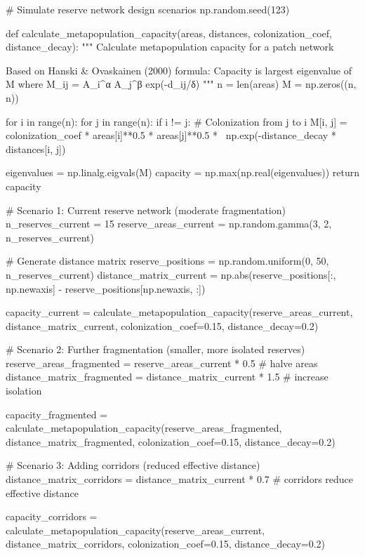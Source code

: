 \documentclass[11pt,a4paper]{article}
\begin{document}
\begin{pycode}
# Simulate reserve network design scenarios
np.random.seed(123)

def calculate_metapopulation_capacity(areas, distances, colonization_coef, distance_decay):
    """
    Calculate metapopulation capacity for a patch network

    Based on Hanski & Ovaskainen (2000) formula:
    Capacity is largest eigenvalue of M where M_ij = A_i^α A_j^β exp(-d_ij/δ)
    """
    n = len(areas)
    M = np.zeros((n, n))

    for i in range(n):
        for j in range(n):
            if i != j:
                # Colonization from j to i
                M[i, j] = colonization_coef * areas[i]**0.5 * areas[j]**0.5 * \
                         np.exp(-distance_decay * distances[i, j])

    eigenvalues = np.linalg.eigvals(M)
    capacity = np.max(np.real(eigenvalues))
    return capacity

# Scenario 1: Current reserve network (moderate fragmentation)
n_reserves_current = 15
reserve_areas_current = np.random.gamma(3, 2, n_reserves_current)

# Generate distance matrix
reserve_positions = np.random.uniform(0, 50, n_reserves_current)
distance_matrix_current = np.abs(reserve_positions[:, np.newaxis] - reserve_positions[np.newaxis, :])

capacity_current = calculate_metapopulation_capacity(reserve_areas_current, distance_matrix_current,
                                                    colonization_coef=0.15, distance_decay=0.2)

# Scenario 2: Further fragmentation (smaller, more isolated reserves)
reserve_areas_fragmented = reserve_areas_current * 0.5  # halve areas
distance_matrix_fragmented = distance_matrix_current * 1.5  # increase isolation

capacity_fragmented = calculate_metapopulation_capacity(reserve_areas_fragmented,
                                                       distance_matrix_fragmented,
                                                       colonization_coef=0.15, distance_decay=0.2)

# Scenario 3: Adding corridors (reduced effective distance)
distance_matrix_corridors = distance_matrix_current * 0.7  # corridors reduce effective distance

capacity_corridors = calculate_metapopulation_capacity(reserve_areas_current,
                                                      distance_matrix_corridors,
                                                      colonization_coef=0.15, distance_decay=0.2)


\end{pycode}
\end{document}
